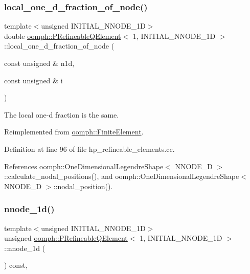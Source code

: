 \subsubsection{\texorpdfstring{local\+\_\+one\+\_\+d\+\_\+fraction\+\_\+of\+\_\+node()}{local\_one\_d\_fraction\_of\_node()}}
{\footnotesize\ttfamily template$<$unsigned I\+N\+I\+T\+I\+A\+L\+\_\+\+N\+N\+O\+D\+E\+\_\+1D$>$ \\
double \hyperlink{classoomph_1_1PRefineableQElement}{oomph\+::\+P\+Refineable\+Q\+Element}$<$ 1, I\+N\+I\+T\+I\+A\+L\+\_\+\+N\+N\+O\+D\+E\+\_\+1D $>$\+::local\+\_\+one\+\_\+d\+\_\+fraction\+\_\+of\+\_\+node (\begin{DoxyParamCaption}\item[{const unsigned \&}]{n1d,  }\item[{const unsigned \&}]{i }\end{DoxyParamCaption})\hspace{0.3cm}{\ttfamily [virtual]}}



The local one-\/d fraction is the same. 



Reimplemented from \hyperlink{classoomph_1_1FiniteElement_adb8ec7d2ceda37528c2d4542d572edf4}{oomph\+::\+Finite\+Element}.



Definition at line 96 of file hp\+\_\+refineable\+\_\+elements.\+cc.



References oomph\+::\+One\+Dimensional\+Legendre\+Shape$<$ N\+N\+O\+D\+E\+\_\+D $>$\+::calculate\+\_\+nodal\+\_\+positions(), and oomph\+::\+One\+Dimensional\+Legendre\+Shape$<$ N\+N\+O\+D\+E\+\_\+D $>$\+::nodal\+\_\+position().

\mbox{\label{classoomph_1_1PRefineableQElement_3_011_00_01INITIAL__NNODE__1D_01_4_ab6b8cae22708b3db0e29e095f43fad6a}} 
\subsubsection{\texorpdfstring{nnode\+\_\+1d()}{nnode\_1d()}}
{\footnotesize\ttfamily template$<$unsigned I\+N\+I\+T\+I\+A\+L\+\_\+\+N\+N\+O\+D\+E\+\_\+1D$>$ \\
unsigned \hyperlink{classoomph_1_1PRefineableQElement}{oomph\+::\+P\+Refineable\+Q\+Element}$<$ 1, I\+N\+I\+T\+I\+A\+L\+\_\+\+N\+N\+O\+D\+E\+\_\+1D $>$\+::nnode\+\_\+1d (\begin{DoxyParamCaption}{ }\end{DoxyParamCaption}) const\hspace{0.3cm}{\ttfamily [inline]}, {\ttfamily [virtual]}}



